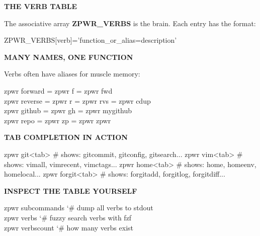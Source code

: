 \documentclass[11pt,a4paper,twoside]{book}
\begin{document}
\vspace{12pt}
{\bfseries\color{neonyellow} THE VERB TABLE}\vspace{4pt}

The associative array \textbf{ZPWR\_VERBS} is the brain. Each entry has the format:

\begin{codebox}
\color{neongreen}ZPWR\_VERBS[verb]='function\_or\_alias=description'\\
\end{codebox}


\vspace{12pt}
{\bfseries\color{neonyellow} MANY NAMES, ONE FUNCTION}\vspace{4pt}

Verbs often have aliases for muscle memory:

\begin{codebox}
\color{neongreen}zpwr forward  = zpwr f   = zpwr fwd\\
\color{neongreen}zpwr reverse  = zpwr r   = zpwr rvs = zpwr cdup\\
\color{neongreen}zpwr github   = zpwr gh  = zpwr mygithub\\
\color{neongreen}zpwr repo     = zpwr zp  = zpwr zpwr\\
\end{codebox}


\vspace{12pt}
{\bfseries\color{neonyellow} TAB COMPLETION IN ACTION}\vspace{4pt}

zpwr git<tab>     \# shows: gitcommit, gitconfig, gitsearch... zpwr vim<tab>     \# shows: vimall, vimrecent, vimctags... zpwr home<tab>    \# shows: home, homeenv, homelocal... zpwr forgit<tab>  \# shows: forgitadd, forgitlog, forgitdiff...


\vspace{12pt}
{\bfseries\color{neonyellow} INSPECT THE TABLE YOURSELF}\vspace{4pt}

\begin{codebox}
\color{neongreen}zpwr subcommands        {\char`\#} dump all verbs to stdout\\
\color{neongreen}zpwr verbs     {\char`\#} fuzzy search verbs with fzf\\
\color{neongreen}zpwr verbscount          {\char`\#} how many verbs exist\\
\end{codebox}
\end{document}
